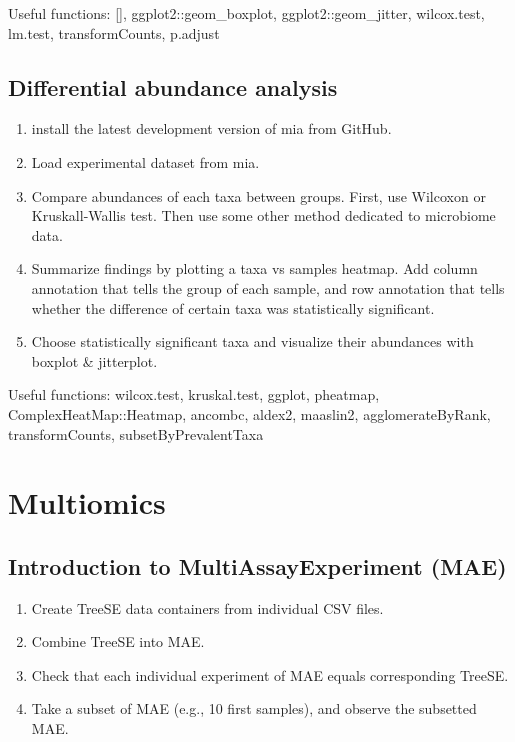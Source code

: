 \documentclass[
]{book}
\providecommand{\tightlist}{%
  \setlength{\itemsep}{0pt}\setlength{\parskip}{0pt}}
\begin{document}
Useful functions: {[}{]}, ggplot2::geom\_boxplot, ggplot2::geom\_jitter, wilcox.test, lm.test, transformCounts, p.adjust

\hypertarget{differential-abundance-analysis-1}{%
\subsection{Differential abundance analysis}\label{differential-abundance-analysis-1}}

\begin{enumerate}
\def\labelenumi{\arabic{enumi}.}
\tightlist
\item
  install the latest development version of mia from GitHub.
\item
  Load experimental dataset from mia.
\item
  Compare abundances of each taxa between groups. First, use Wilcoxon or Kruskall-Wallis test. Then use some other method dedicated to microbiome data.
\item
  Summarize findings by plotting a taxa vs samples heatmap. Add column annotation that tells the group of each sample, and row annotation that tells whether the difference of certain taxa was statistically significant.
\item
  Choose statistically significant taxa and visualize their abundances with boxplot \& jitterplot.
\end{enumerate}

Useful functions: wilcox.test, kruskal.test, ggplot, pheatmap, ComplexHeatMap::Heatmap, ancombc, aldex2, maaslin2, agglomerateByRank, transformCounts, subsetByPrevalentTaxa

\hypertarget{multiomics}{%
\section{Multiomics}\label{multiomics}}

\hypertarget{introduction-to-multiassayexperiment-mae}{%
\subsection{Introduction to MultiAssayExperiment (MAE)}\label{introduction-to-multiassayexperiment-mae}}

\begin{enumerate}
\def\labelenumi{\arabic{enumi}.}
\tightlist
\item
  Create TreeSE data containers from individual CSV files.
\item
  Combine TreeSE into MAE.
\item
  Check that each individual experiment of MAE equals corresponding TreeSE.
\item
  Take a subset of MAE (e.g., 10 first samples), and observe the subsetted MAE.
\end{enumerate}
\end{document}
